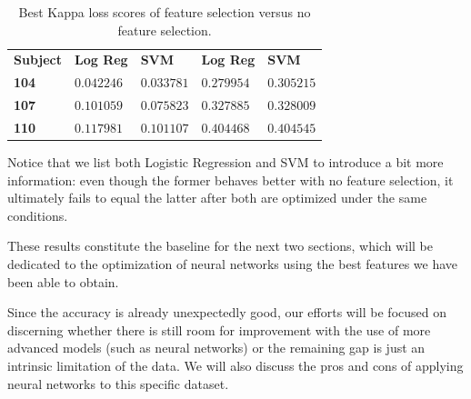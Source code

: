     \begin{table}[h]

        \centering
        \setlength\arrayrulewidth{0.8pt}

        \begin{tabular}{| >{\centering\arraybackslash}m{0.7in} | >{\centering\arraybackslash}m{0.7in} | >{\centering\arraybackslash}m{0.7in} | >{\centering\arraybackslash}m{0.7in} | >{\centering\arraybackslash}m{0.7in} |}

			\hline
			\rowcolor{RoyalBlue}
			 & \multicolumn{2}{|c|}{\textbf{Feature selection}} & \multicolumn{2}{|c|}{\textbf{No feature selection}} \\
			\hline
            \rowcolor{RoyalBlue}
            \textbf{Subject} & \textbf{Log Reg} & \textbf{SVM} & \textbf{Log Reg} & \textbf{SVM} \\
            \hline
            \cellcolor{RoyalBlue}\textbf{104} & $0.042246$ & $0.033781$ & $0.279954$ & $0.305215$ \\
            \hline
            \cellcolor{RoyalBlue}\textbf{107} & $0.101059$ & $0.075823$ & $0.327885$ & $0.328009$ \\
            \hline
            \cellcolor{RoyalBlue}\textbf{110} & $0.117981$ & $0.101107$ & $0.404468$ & $0.404545$ \\
            \hline

        \end{tabular}

        \caption{Best Kappa loss scores of feature selection versus no feature selection.}\label{table:feature_selection_comparison}

    \end{table}

    Notice that we list both Logistic Regression and \acs{SVM} to introduce a bit more information: even though the former behaves better with no feature selection, it ultimately fails to equal the latter after both are optimized under the same conditions.

    These results constitute the baseline for the next two sections, which will be dedicated to the optimization of neural networks using the best features we have been able to obtain.

    Since the accuracy is already unexpectedly good, our efforts will be focused on discerning whether there is still room for improvement with the use of more advanced models (such as neural networks) or the remaining gap is just an intrinsic limitation of the data. We will also discuss the pros and cons of applying neural networks to this specific dataset.

